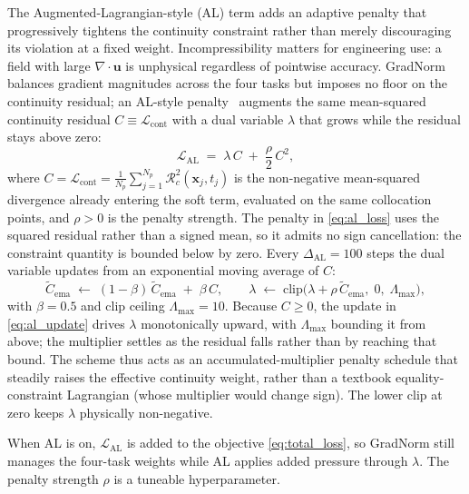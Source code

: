 The Augmented-Lagrangian-style (AL) term adds an adaptive penalty that progressively tightens the continuity constraint rather than merely discouraging its violation at a fixed weight. Incompressibility matters for engineering use: a field with large $\nabla\!\cdot\!\mathbf{u}$ is unphysical regardless of pointwise accuracy. GradNorm balances gradient magnitudes across the four tasks but imposes no floor on the continuity residual; an AL-style penalty~\cite{NocedalWright2006} augments the same mean-squared continuity residual $C \equiv \mathcal{L}_{\text{cont}}$ with a dual variable $\lambda$ that grows while the residual stays above zero:
\begin{equation}
    \label{eq:al_loss}
    \mathcal{L}_{\text{AL}} \;=\; \lambda\,C \;+\; \frac{\rho}{2}\,C^2,
\end{equation}
where $C = \mathcal{L}_{\text{cont}} = \frac{1}{N_p}\sum_{j=1}^{N_p}\mathcal{R}_c^2(\mathbf{x}_j, t_j)$ is the non-negative mean-squared divergence already entering the soft term, evaluated on the same collocation points, and $\rho > 0$ is the penalty strength. The penalty in \eqref{eq:al_loss} uses the squared residual rather than a signed mean, so it admits no sign cancellation: the constraint quantity is bounded below by zero. Every $\Delta_{\text{AL}} = 100$ steps the dual variable updates from an exponential moving average of $C$:
\begin{equation}
    \label{eq:al_update}
    \tilde{C}_{\text{ema}} \;\leftarrow\; (1-\beta)\,\tilde{C}_{\text{ema}} \;+\; \beta\,C,\qquad
    \lambda \;\leftarrow\; \mathrm{clip}\!\Big(\lambda + \rho\,\tilde{C}_{\text{ema}},\;0,\;\Lambda_{\max}\Big),
\end{equation}
with $\beta=0.5$ and clip ceiling $\Lambda_{\max}=10$. Because $C \ge 0$, the update in \eqref{eq:al_update} drives $\lambda$ monotonically upward, with $\Lambda_{\max}$ bounding it from above; the multiplier settles as the residual falls rather than by reaching that bound. The scheme thus acts as an accumulated-multiplier penalty schedule that steadily raises the effective continuity weight, rather than a textbook equality-constraint Lagrangian (whose multiplier would change sign). The lower clip at zero keeps $\lambda$ physically non-negative.

When AL is on, $\mathcal{L}_{\text{AL}}$ is added to the objective \eqref{eq:total_loss}, so GradNorm still manages the four-task weights while AL applies added pressure through $\lambda$. The penalty strength $\rho$ is a tuneable hyperparameter.

